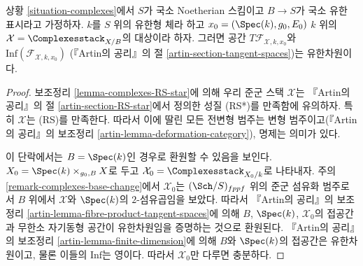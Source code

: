 \begin{lemma}
\label{lemma-complexes-tangent-space}
상황 \ref{situation-complexes}에서 $S$가 국소 Noetherian 스킴이고 $B \to S$가
국소 유한 표시라고 가정하자. $k$를 $S$ 위의 유한형 체라 하고
$x_0 = (\Spec(k), g_0, E_0)$
$k$ 위의 $\mathcal{X} = \Complexesstack_{X/B}$의 대상이라 하자. 그러면 공간
$T\mathcal{F}_{\mathcal{X}, k, x_0}$와
$\text{Inf}(\mathcal{F}_{\mathcal{X}, k, x_0})$
(『Artin의 공리』의 절 \ref{artin-section-tangent-spaces})는 유한차원이다.
\end{lemma}

\begin{proof}
보조정리 \ref{lemma-complexes-RS-star}에 의해 우리 준군 스택 $\mathcal{X}$는
『Artin의 공리』의 절 \ref{artin-section-RS-star}에서 정의한 성질 (RS*)를
만족함에 유의하자. 특히 $\mathcal{X}$는 (RS)를 만족한다. 따라서 이에 딸린
모든 전변형 범주는 변형 범주이고(『Artin의 공리』의 보조정리
\ref{artin-lemma-deformation-category}), 명제는 의미가 있다.

\medskip\noindent
이 단락에서는 $B = \Spec(k)$인 경우로 환원할 수 있음을 보인다.
$X_0 = \Spec(k) \times_{g_0, B} X$로 두고
$\mathcal{X}_0 = \Complexesstack_{X_0/k}$로 나타내자. 주의
\ref{remark-complexes-base-change}에서 $\mathcal{X}_0$는 $(\Sch/S)_{fppf}$ 위의
준군 섬유화 범주로서 $B$ 위에서 $\mathcal{X}$와 $\Spec(k)$의 $2$-섬유곱임을
보았다. 따라서 『Artin의 공리』의 보조정리
\ref{artin-lemma-fibre-product-tangent-spaces}에 의해 $B$, $\Spec(k)$,
$\mathcal{X}_0$의 접공간과 무한소 자기동형 공간이 유한차원임을 증명하는 것으로
환원된다. 『Artin의 공리』의 보조정리 \ref{artin-lemma-finite-dimension}에 의해
$B$와 $\Spec(k)$의 접공간은 유한차원이고, 물론 이들의 $\text{Inf}$는 영이다.
따라서 $\mathcal{X}_0$만 다루면 충분하다.


\end{proof}
